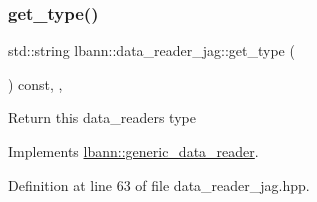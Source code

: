 \subsubsection{\texorpdfstring{get\+\_\+type()}{get\_type()}}
{\footnotesize\ttfamily std\+::string lbann\+::data\+\_\+reader\+\_\+jag\+::get\+\_\+type (\begin{DoxyParamCaption}{ }\end{DoxyParamCaption}) const\hspace{0.3cm}{\ttfamily [inline]}, {\ttfamily [override]}, {\ttfamily [virtual]}}

Return this data\+\_\+reader\textquotesingle{}s type 

Implements \hyperlink{classlbann_1_1generic__data__reader_abeb849fb8e10b4fa317c90bc33f61758}{lbann\+::generic\+\_\+data\+\_\+reader}.



Definition at line 63 of file data\+\_\+reader\+\_\+jag.\+hpp.


